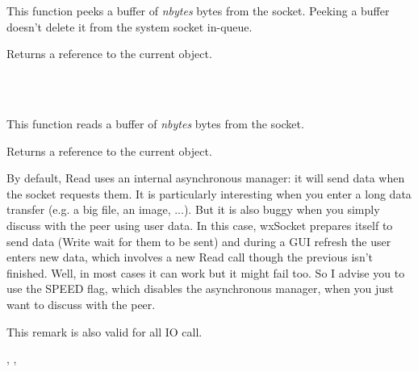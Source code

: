 This function peeks a buffer of {\it nbytes} bytes from the socket. Peeking a buffer
doesn't delete it from the system socket in-queue.





Returns a reference to the current object.


\\
\\

%
%
\label{wxsocketbaseread}


This function reads a buffer of {\it nbytes} bytes from the socket.





Returns a reference to the current object.


By default, Read uses an internal asynchronous manager: it will send data when
the socket requests them. It is particularly interesting when you enter a long
data transfer (e.g. a big file, an image, ...). But it is also buggy when you
simply discuss with the peer using user data. In this case, wxSocket prepares
itself to send data (Write wait for them to be sent) and during a GUI refresh
the user enters new data, which involves a new Read call though the previous
isn't finished. Well, in most cases it can work but it might fail too.
So I advise you to use the SPEED flag, which disables the asynchronous manager,
when you just want to discuss with the peer.

This remark is also valid for all IO call.


,
 ,
 
